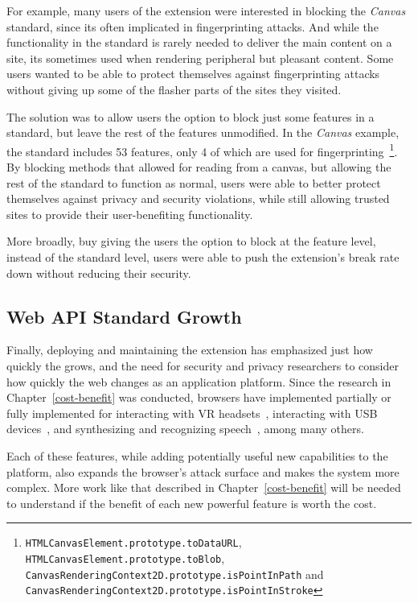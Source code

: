 For example, many users of the extension were interested in blocking the
\textit{Canvas} standard, since its often implicated in fingerprinting attacks.
And while the functionality in the standard is rarely needed to deliver the
main content on a site, its sometimes used when rendering peripheral but
pleasant content.  Some users wanted to be able to protect themselves against
fingerprinting attacks without giving up some of the flasher parts of the sites
they visited.

The solution was to allow users the option to block
just some features in a standard, but leave the rest of the features
unmodified.  In the \textit{Canvas} example, the standard includes 53 features,
only 4 of which are used for fingerprinting~\footnote{%
\texttt{HTMLCanvasElement.prototype.toDataURL},
\texttt{HTMLCanvasElement.prototype.toBlob},
\texttt{CanvasRenderingContext2D.prototype.isPointInPath} and
\texttt{CanvasRenderingContext2D.prototype.isPointInStroke}}.  By blocking
methods that allowed for reading from a canvas, but allowing the rest of the
standard to function as normal, users were able to better protect themselves against
privacy and security violations, while still allowing trusted sites to provide
their user-benefiting functionality.

More broadly, buy giving the users the option to block at the feature level,
instead of the standard level, users were able to push the extension's break
rate down without reducing their security.


\subsection{Web API Standard Growth}
Finally, deploying and maintaining the extension has emphasized just how
quickly the \WAPI grows, and the need for security and privacy
researchers to consider how quickly the web changes as an application
platform.  Since the research in Chapter~\ref{cost-benefit} was conducted,
browsers have implemented partially or fully implemented \WAS for interacting
with VR headsets~\cite{webvrstandard}, interacting with USB
devices~\cite{webusbstandard}, and synthesizing and recognizing
speech~\cite{speechtandard}, among many others.

Each of these features, while adding potentially useful new capabilities to the
platform, also expands the browser's attack surface and makes the system more
complex.  More work like that described in Chapter~\ref{cost-benefit} will be
needed to understand if the benefit of each new powerful feature is worth the
cost.
